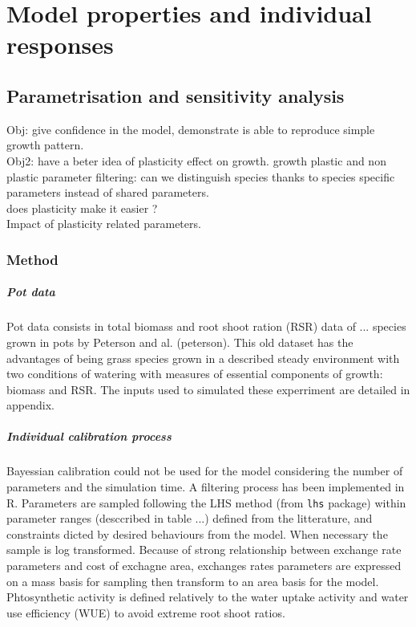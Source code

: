 
\chapter{Model properties and individual responses}


\section{Parametrisation and sensitivity analysis}
Obj: give confidence in the model, demonstrate is able to reproduce simple growth pattern.\\
Obj2: have a beter idea of plasticity effect on growth.
growth plastic and non plastic parameter filtering: can we distinguish species thanks to species specific parameters instead of shared parameters.\\
does plasticity make it easier ?\\
Impact of plasticity related parameters.\\

\subsection{Method}

\paragraph{Pot data}
Pot data consists in total biomass and root shoot ration (RSR) data of ... species grown in pots by Peterson and al. (peterson). This old dataset has the advantages of being grass species grown in a described steady environment with two conditions of watering with measures of essential components of growth: biomass and RSR. The inputs used to simulated these experriment are detailed in appendix.

\paragraph{Individual calibration process}
Bayessian calibration could not be used for the model considering the number of parameters and the simulation time. A filtering process has been implemented in R. Parameters are sampled following the LHS method (from \texttt{lhs} package)	within parameter ranges (desccribed in table ...) defined from the litterature, and constraints dicted by desired behaviours from the model. When necessary the sample is log transformed. Because of strong relationship between exchange rate parameters and cost of exchagne area, exchanges rates parameters are expressed on a mass basis for sampling then transform to an area basis for the model. Phtosynthetic activity is defined relatively to the water uptake activity and water use efficiency (WUE) to avoid extreme root shoot ratios.\\

